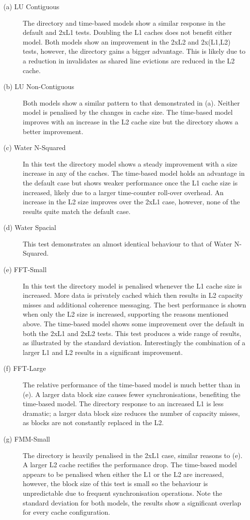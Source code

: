 		\begin{description}
			\item [(a) LU Contiguous] The directory and time-based models show a similar response in the default and 2xL1 tests. Doubling the L1 caches does not benefit either model. Both models show an improvement in the 2xL2 and 2x(L1,L2) tests, however, the directory gains a bigger advantage. This is likely due to a reduction in invalidates as shared line evictions are reduced in the L2 cache.
			\item [(b) LU Non-Contiguous] Both models show a similar pattern to that demonstrated in (a). Neither model is penalised by the changes in cache size. The time-based model improves with an increase in the L2 cache size but the directory shows a better improvement.
			\item [(c) Water N-Squared] In this test the directory model shows a steady improvement with a size increase in any of the caches. The time-based model holds an advantage in the default case but shows weaker performance once the L1 cache size is increased, likely due to a larger time-counter roll-over overhead. An increase in the L2 size improves over the 2xL1 case, however, none of the results quite match the default case.
			\item [(d) Water Spacial] This test demonstrates an almost identical behaviour to that of Water N-Squared.
			\item [(e) FFT-Small] In this test the directory model is penalised whenever the L1 cache size is increased. More data is privately cached which then results in L2 capacity misses and additional coherence messaging. The best performance is shown when only the L2 size is increased, supporting the reasons mentioned above. The time-based model shows some improvement over the default in both the 2xL1 and 2xL2 tests. This test produces a wide range of results, as illustrated by the standard deviation. Interestingly the combination of a larger L1 and L2 results in a significant improvement.
			\item [(f) FFT-Large] The relative performance of the time-based model is much better than in (e). A larger data block size causes fewer synchronisations, benefiting the time-based model. The directory response to an increased L1 is less dramatic; a larger data block size reduces the number of capacity misses, as blocks are not constantly replaced in the L2.
			\item [(g) FMM-Small] The directory is heavily penalised in the 2xL1 case, similar reasons to (e). A larger L2 cache rectifies the performance drop. The time-based model appears to be penalised when either the L1 or the L2 are increased, however, the block size of this test is small so the behaviour is unpredictable due to frequent synchronisation operations. Note the standard deviation for both models, the results show a significant overlap for every cache configuration.

\end{description}
